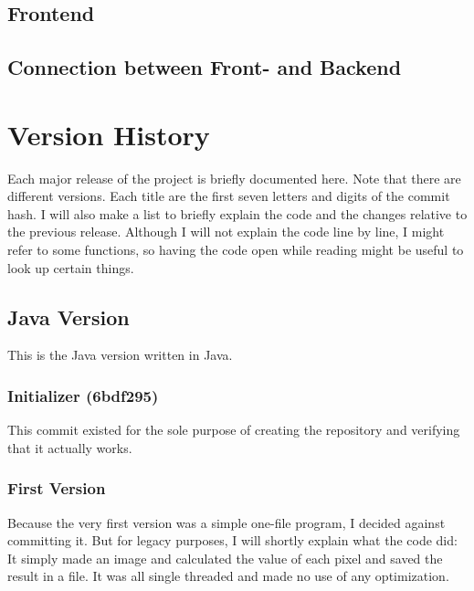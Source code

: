\documentclass[10pt,a4paper,titlepage]{article}
\begin{document}
	\subsection{Frontend}
	\subsection{Connection between Front- and Backend}
	
	\section{Version History}
	Each major release of the project is briefly documented here. Note that there are different versions. Each title are the first seven letters and digits of the commit hash. I will also make a list to briefly explain the code and the changes relative to the previous release. Although I will not explain the code line by line, I might refer to some functions, so having the code open while reading might be useful to look up certain things.
	\subsection{Java Version}
	This is the Java version written in Java.
	\subsubsection{Initializer (6bdf295)}
	This commit existed for the sole purpose of creating the repository and verifying that it actually works.
	\subsubsection{First Version}
	Because the very first version was a simple one-file program, I decided against committing it. But for legacy purposes, I will shortly explain what the code did: It simply made an image and calculated the value of each pixel and saved the result in a file. It was all single threaded and made no use of any optimization.
\end{document}
